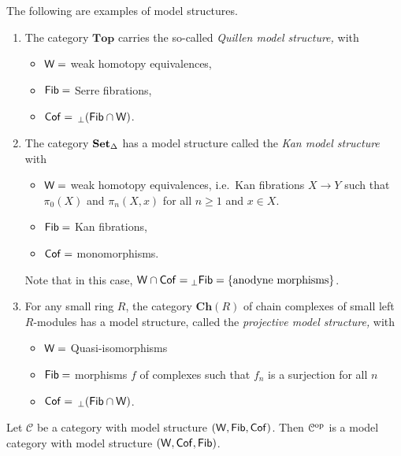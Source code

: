 \documentclass[main.tex]{subfiles}
\begin{document}
\begin{example}
  The following are examples of model structures.
  \begin{enumerate}
    \item The category $\mathbf{Top}$ carries the so-called \emph{Quillen model structure,} with
      \begin{itemize}
        \item $\mathsf{W} =$ weak homotopy equivalences,

        \item $\mathsf{Fib} =$ Serre fibrations,

        \item $\mathsf{Cof} =$ ${}_{\perp}(\mathsf{Fib} \cap \mathsf{W})$.
      \end{itemize}

    \item The category $\operatorname{\mathbf{Set}_{\Delta}}$ has a model structure called the \emph{Kan model structure} with
      \begin{itemize}
        \item $\mathsf{W} =$ weak homotopy equivalences, i.e.\ Kan fibrations $X \to Y$ such that $\pi_{0}(X)$ and $\pi_{n}(X, x)$ for all $n \geq 1$ and $x \in X$.

        \item $\mathsf{Fib} =$ Kan fibrations,

        \item $\mathsf{Cof} =$ monomorphisms.
      \end{itemize}

      Note that in this case, $\mathsf{W} \cap \mathsf{Cof} = {}_{\perp}\mathsf{Fib} = \{\text{anodyne morphisms}\}$.

    \item For any small ring $R$, the category $\mathbf{Ch}(R)$ of chain complexes of small left $R$-modules has a model structure, called the \emph{projective model structure,} with
      \begin{itemize}
        \item $\mathsf{W} = $ Quasi-isomorphisms

        \item $\mathsf{Fib} = $ morphisms $f$ of complexes such that $f_{n}$ is a surjection for all $n$

        \item $\mathsf{Cof} =$ ${}_{\perp}(\mathsf{Fib} \cap \mathsf{W})$.
      \end{itemize}
  \end{enumerate}
\end{example}

\begin{example}
  \label{eg:opposite_model_category}
  Let $\mathcal{C}$ be a category with model structure $(\mathsf{W}, \mathsf{Fib}, \mathsf{Cof})$. Then $\mathcal{C}^{\mathrm{op}}$ is a model category with model structure $(\mathsf{W}, \mathsf{Cof}, \mathsf{Fib})$.
\end{example}
\end{document}
